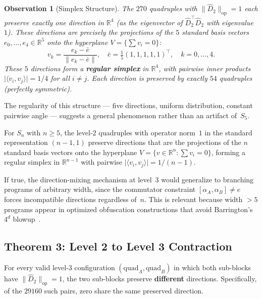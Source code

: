 \documentclass[version=submission]{iacrcc}
\newtheorem{observation}[theorem]{Observation}
\newcommand{\norm}[1]{\lVert #1 \rVert}
\newcommand{\abs}[1]{\lvert #1 \rvert}
\newcommand{\opn}[1]{\norm{#1}_{\mathrm{op}}}
\newcommand{\Dhat}{\widehat{D}}
\begin{document}
\begin{observation}[Simplex Structure]
\label{obs:simplex}
The $270$ quadruples with $\opn{\Dhat_2} = 1$ each preserve exactly one direction
in $\mathbb{R}^4$ (as the eigenvector of $\Dhat_2^\top \Dhat_2$ with eigenvalue $1$).
These directions are precisely the projections of the $5$ standard basis vectors
$e_0, \ldots, e_4 \in \mathbb{R}^5$ onto the hyperplane $V = \{\sum v_i = 0\}$:
\[
v_k = \frac{e_k - \bar{e}}{\norm{e_k - \bar{e}}}, \quad
\bar{e} = \tfrac{1}{5}(1,1,1,1,1)^\top, \quad k = 0, \ldots, 4.
\]
These $5$ directions form a \textbf{regular simplex} in $\mathbb{R}^4$, with
pairwise inner products $\abs{\langle v_i, v_j \rangle} = 1/4$ for all $i \neq j$.
Each direction is preserved by exactly $54$ quadruples (perfectly symmetric).
\end{observation}

The regularity of this structure --- five directions, uniform distribution,
constant pairwise angle --- suggests a general phenomenon rather than
an artifact of~$S_5$.

\begin{conjecture}
\label{conj:simplex}
For $S_n$ with $n \geq 5$, the level-$2$ quadruples with operator norm~$1$
in the standard representation $(n-1,1)$ preserve directions that are
the projections of the $n$ standard basis vectors onto the hyperplane
$V = \{v \in \mathbb{R}^n : \sum v_i = 0\}$, forming a regular simplex
in $\mathbb{R}^{n-1}$ with pairwise $\abs{\langle v_i, v_j \rangle} = 1/(n-1)$.
\end{conjecture}

If true, the direction-mixing mechanism at level~$3$ would generalize
to branching programs of arbitrary width, since the commutator constraint
$[\alpha_A, \alpha_B] \neq e$ forces incompatible directions regardless
of~$n$.  This is relevant because width $> 5$ programs appear in optimized
obfuscation constructions that avoid Barrington's $4^d$
blowup~\cite{AGIS14}.


\subsection{Theorem 3: Level 2 to Level 3 Contraction}

\begin{lemma}
\label{lem:mixing}
For every valid level-$3$ configuration $(\mathrm{quad}_A, \mathrm{quad}_B)$
in which both sub-blocks have $\opn{\Dhat_2} = 1$, the two sub-blocks
preserve \textbf{different} directions. Specifically, of the $29160$ such pairs,
zero share the same preserved direction.
\end{lemma}
\end{document}
